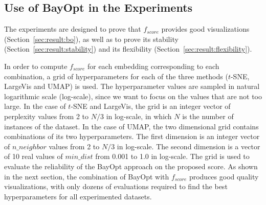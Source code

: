 \subsection{Use of BayOpt in the Experiments}\label{sec:xp:proof}

The experiments are designed to prove that $f_{score}$ provides good visualizations (Section~\ref{sec:result:bo}), as well as to prove its stability (Section~\ref{sec:result:stability}) and its flexibility (Section~\ref{sec:result:flexibility}).

In order to compute $f_{score}$ for each embedding corresponding to each combination, a grid of hyperparameters for each of the three methods ($t$-SNE, LargeVis and UMAP) is used.
The hyperparameter values are sampled in natural logarithmic scale (log-scale), since we want to focus on the values that are not too large.
In the case of $t$-SNE and LargeVis, the grid is an integer vector of perplexity values from 2 to $N/3$ in log-scale, in which $N$ is the number of instances of the dataset.
In the case of UMAP, the two dimensional grid contains combinations of its two hyperparameters.
The first dimension is an integer vector of $n\_neighbor$ values from 2 to $N/3$ in log-scale.
The second dimension is a vector of 10 real values of $min\_dist$ from 0.001 to 1.0 in log-scale.
The grid is used to evaluate the reliability of the BayOpt approach on the proposed score.
As shown in the next section, the combination of BayOpt with $f_{score}$ produces good quality visualizations, with only dozens of evaluations required to find the best hyperparameters for all experimented datasets.


